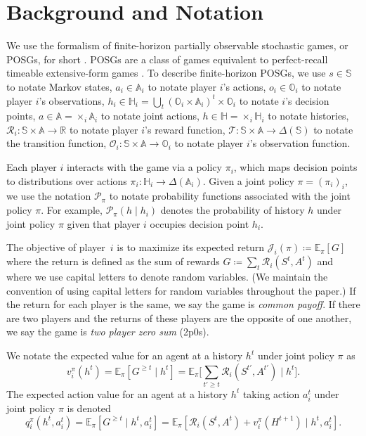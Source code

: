 \documentclass{article} %
\theoremstyle{plain}
\theoremstyle{definition}
\theoremstyle{remark}
\begin{document}
\section{Background and Notation}

We use the formalism of finite-horizon partially observable stochastic games, or POSGs, for short \citep{posg}.
POSGs are a class of games equivalent to perfect-recall timeable extensive-form games \citep{timeable,fosg}. 
To describe finite-horizon POSGs, we use  $s \in \mathbb{S}$ to notate Markov states, $a_i \in \mathbb{A}_i$ to notate player $i$'s actions, $o_i \in \mathbb{O}_i$ to notate player $i$'s observations, $h_i \in \mathbb{H}_i = \bigcup_t (\mathbb{O}_i \times \mathbb{A}_i)^{t} \times \mathbb{O}_i$ to notate $i$'s decision points, $a \in \mathbb{A} = \times_i \mathbb{A}_i$ to notate joint actions, $h \in \mathbb{H} = \times_i \mathbb{H}_i$ to notate histories, $\mathcal{R}_i \colon \mathbb{S} \times \mathbb{A} \to \mathbb{R}$ to notate player $i$'s reward function, $\mathcal{T} \colon \mathbb{S} \times \mathbb{A} \to \Delta(\mathbb{S})$ to notate the transition function, $\mathcal{O}_i \colon \mathbb{S} \times \mathbb{A} \to \mathbb{O}_i$ to notate player $i$'s observation function.

Each player $i$ interacts with the game via a policy $\pi_i$, which maps decision points to distributions over actions $\pi_i \colon \mathbb{H}_i \to \Delta (\mathbb{A}_i)$.
Given a joint policy $\pi = (\pi_i)_{i}$, we use the notation $\mathcal{P}_{\pi}$ to notate probability functions associated with the joint policy $\pi$.
For example, $\mathcal{P}_{\pi}(h \mid h_i)$ denotes the probability of history $h$ under joint policy $\pi$ given that player $i$ occupies decision point $h_i$.

The objective of player~$i$ is to maximize its expected return $\mathcal{J}_i(\pi) \coloneqq \mathbb{E}_{\pi} [G]$ where the return is defined as the sum of rewards $G \coloneqq \sum_t \mathcal{R}_i(S^t, A^t)$
and where we use capital letters to denote random variables.
(We maintain the convention of using capital letters for random variables throughout the paper.)
If the return for each player is the same, we say the game is \textit{common payoff}.
If there are two players and the returns of these players are the opposite of one another, we say the game is \textit{two player zero sum} (2p0s).

We notate the expected value for an agent at a history $h^t$ under joint policy $\pi$ as 
\[v^{\pi}_i(h^t) = \mathbb{E}_{\pi} [G^{\geq t} \mid h^t] = \mathbb{E}_{\pi} \Bigg[\sum_{t'\geq t} \mathcal{R}_i(S^{t'}, A^{t'}) \mid h^t\Bigg].\]
The expected action value for an agent at a history $h^t$ taking action $a_i^t$ under joint policy $\pi$ is denoted
\[q_i^{\pi}(h^t, a_i^t) = \mathbb{E}_{\pi}[G^{\geq t} \mid h^t, a_i^t] = \mathbb{E}_{\pi} \left[\mathcal{R}_i(S^t, A^t) + v_i^{\pi}(H^{t+1}) \mid h^t, a_i^t\right].\]
\end{document}
